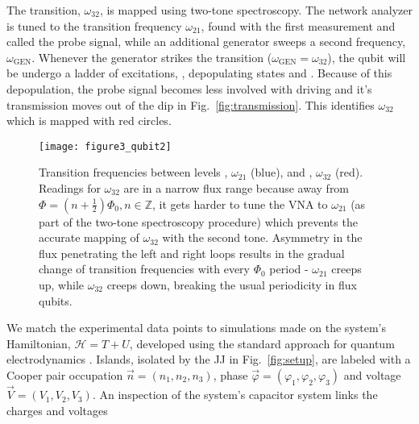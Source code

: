 The  \ilra{}  transition,  $\omega_{32}$,  is
mapped using two-tone spectroscopy. The network analyzer is
tuned to  the transition  frequency $ \omega_{21}  $, found
with  the first  measurement and  called the  probe signal,
while an  additional generator  sweeps a  second frequency,
$  \omega_{\text{GEN}} $.   Whenever the  generator strikes
the             \ira{}             transition
($\omega_{\text{GEN}} =  \omega_{32} $), the qubit  will be
undergo     a    ladder     of    excitations,     
     
,  depopulating   states     and  .
Because of this depopulation, the probe signal becomes less
involved with  driving and  it's transmission moves  out of
the  dip in  Fig.~\ref{fig:transmission}.  This  identifies
$\omega_{32}$ which is mapped with red circles.



\begin{figure}[h]
  \texttt{[image: figure3\_qubit2]}
  \caption{\small  Transition  frequencies  between  levels
    \ilra  {}, $  \omega_{21}  $ (blue),  and
       \ilra   {},  $   \omega_{32}$   (red).
    Readings for $ \omega_{32} $ are in a narrow flux range
    because                    away                    from
    $ \Phi = (n  + \frac{1}{2})\Phi_0, n\in\mathbb{Z} $, it
    gets harder to tune the VNA to $ \omega_{21} $ (as part
    of the two-tone  spectroscopy procedure) which prevents
    the accurate mapping of $ \omega_{32} $ with the second
    tone.  Asymmetry  in the flux penetrating  the left and
    right loops results in the gradual change of transition
    frequencies   with  every   $  \Phi_{0}   $  period   -
    $\omega_{21}$  creeps  up, while  $\omega_{32}$  creeps
    down, breaking the usual periodicity in flux qubits.}
  \label{fig:experiment}
\end{figure}

We match  the experimental data points  to simulations made
on  the system's  Hamiltonian, $  \mathcal{H}  = T  + U  $,
developed   using  the   standard   approach  for   quantum
electrodynamics  \cite{orlando1999}.  Islands,  isolated by
the JJ  in Fig.~\ref{fig:setup}, are labeled  with a Cooper
pair  occupation  $ \vec{n}  =  (n_1,  n_2, n_3)  $,  phase
$ \vec{\varphi}  = (\varphi_1, \varphi_2, \varphi_3)  $ and
voltage $ \vec{V} = \left(V_{1}, V_{2}, V_{3}\right) $.  An
inspection  of  the  system's capacitor  system  links  the
charges and voltages

